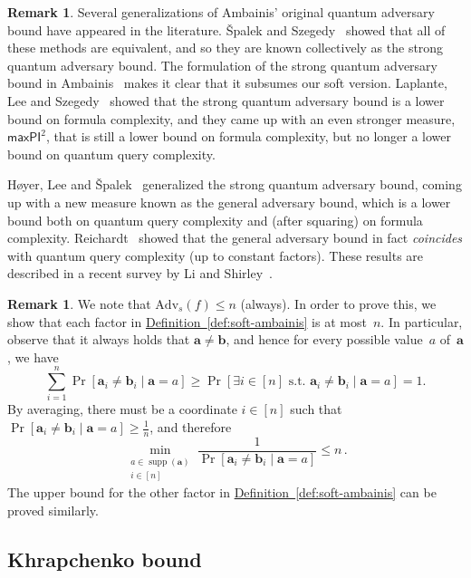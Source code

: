 \documentclass[11pt]{article}
\numberwithin{equation}{section}
\theoremstyle{definition}
\newtheorem{remark}[theorem]{Remark}
\theoremstyle{plain}
\newcommand{\expref}[2]{\hyperref[#2]{#1~\ref{#2}}}
\theoremstyle{definition}\newtheorem{notation}[theorem]{Notation}\theoremstyle{plain}
\renewcommand{\a}{\boldsymbol{a}}
\renewcommand{\b}{\boldsymbol{b}}
\newcommand{\Am}{\mathrm{Adv}_{s}}
\DeclareMathOperator{\supp}{supp}
\theoremstyle{definition}
\theoremstyle{plain}
\begin{document}
\begin{remark}
Several generalizations of Ambainis' original quantum adversary bound
have appeared in the literature. {\v{S}}palek and Szegedy~\cite{SS06}
showed that all of these methods are equivalent, and so they are known
collectively as the strong quantum adversary bound. The formulation
of the strong quantum adversary bound in Ambainis~\cite{A06} makes
it clear that it subsumes our soft version. Laplante, Lee and Szegedy~\cite{LLS06}
showed that the strong quantum adversary bound
%
is a lower bound on %
formula complexity, and
they  %
came up with an even stronger measure, $\mathsf{maxPI}^{2}$,
%
that %
is still a lower bound on  %
formula complexity, but no longer %
a lower bound on  %
quantum query complexity.

H{\o}yer, Lee and {\v{S}}palek~\cite{HLS07} generalized the strong quantum
adversary bound, coming up with a new measure known as the general
adversary bound, which %
is a lower bound both on %
quantum query complexity
and (after squaring)
on %
formula complexity. Reichardt~\cite{R09,R11,LMRSS11,R14}
showed that the general adversary bound in fact \emph{coincides} with
quantum query complexity (up to constant factors). These results are
described in a recent survey by Li and Shirley~\cite{LS20}.
\end{remark}

\begin{remark}
\label{remark:quadratic-barrier}We note that
%
%
%
%
%
%
$\Am(f) \le n$ (always).   %
In order to prove this, we show that
%
%
each factor in \expref{Definition}{def:soft-ambainis} is at most~$n$.  %
In particular, observe that it always
holds that $\a\ne\b$, and hence for every possible value~$a$ of~$\a$,
we have
\[
\sum_{i=1}^{n}\Pr[\a_{i}\neq\b_{i}\mid\a=a]\ge\Pr[\exists i\in[n]\text{ s.t. }\a_{i}\neq\b_{i}\mid\a=a]=1.
\]
By averaging, there must be a coordinate $i\in\left[n\right]$ such
that $\Pr[\a_{i}\neq\b_{i}\mid\a=a]\ge\frac{1}{n}$, and therefore
\[
\min_{\substack{a\in\supp(\a)\\
i\in[n]
}
}\frac{1}{\Pr[\a_{i}\neq\b_{i}\mid\a=a]}\le n \,. %
\]
The upper bound for the other factor in \expref{Definition}{def:soft-ambainis} 
can be proved similarly.
\end{remark}


\subsection{\label{sec:khrapchenko}Khrapchenko bound}
\end{document}
